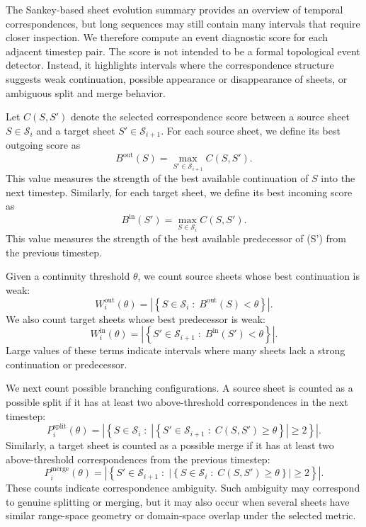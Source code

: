 \documentclass{vgtc}                          %
\newcommand{\Sheets}{\mathcal{S}}
\newcommand{\Sheet}{S}
\newcommand{\Score}{C}
\begin{document}
The Sankey-based sheet evolution summary provides an overview of temporal correspondences, but long sequences may still contain many intervals that require closer inspection. We therefore compute an event diagnostic score for each adjacent timestep pair. The score is not intended to be a formal topological event detector. Instead, it highlights intervals where the correspondence structure suggests weak continuation, possible appearance or disappearance of sheets, or ambiguous split and merge behavior.

Let $\Score(\Sheet,\Sheet')$ denote the selected correspondence score between a source sheet $\Sheet\in\Sheets_i$ and a target sheet $\Sheet'\in\Sheets_{i+1}$. For each source sheet, we define its best outgoing score as
\[
B^\mathrm{out}(\Sheet) =
\max_{\Sheet'\in\Sheets_{i+1}} \Score(\Sheet,\Sheet').
\]
This value measures the strength of the best available continuation of $\Sheet$ into the next timestep. Similarly, for each target sheet, we define its best incoming score as
\[
B^\mathrm{in}(\Sheet') =
\max_{\Sheet\in\Sheets_i} \Score(\Sheet,\Sheet').
\]
This value measures the strength of the best available predecessor of (\Sheet') from the previous timestep.

Given a continuity threshold $\theta$, we count source sheets whose best continuation is weak:
\[
W^\mathrm{out}_i(\theta) =
\left|
\left\{
\Sheet\in\Sheets_i
\;:\;
B^\mathrm{out}(\Sheet) < \theta
\right\}
\right|.
\]
We also count target sheets whose best predecessor is weak:
\[
W^\mathrm{in}_i(\theta) =
\left|
\left\{
\Sheet'\in\Sheets_{i+1}
\;:\;
B^\mathrm{in}(\Sheet') < \theta
\right\}
\right|.
\]
Large values of these terms indicate intervals where many sheets lack a strong continuation or predecessor.

We next count possible branching configurations. A source sheet is counted as a possible split if it has at least two above-threshold correspondences in the next timestep:
\[
P^\mathrm{split}_i(\theta) =
\left|
\left\{
\Sheet\in\Sheets_i
\;:\;
\left|
\left\{
\Sheet'\in\Sheets_{i+1}
\;:\;
\Score(\Sheet,\Sheet') \geq \theta
\right\}
\right|
\geq 2
\right\}
\right|.
\]
Similarly, a target sheet is counted as a possible merge if it has at least two above-threshold correspondences from the previous timestep:
\[
P^\mathrm{merge}_i(\theta) =
\left|
\left\{
\Sheet'\in\Sheets_{i+1}
\;:\;
\left|
\left\{
\Sheet\in\Sheets_i
\;:\;
\Score(\Sheet,\Sheet') \geq \theta
\right\}
\right|
\geq 2
\right\}
\right|.
\]
These counts indicate correspondence ambiguity. Such ambiguity may correspond to genuine splitting or merging, but it may also occur when several sheets have similar range-space geometry or domain-space overlap under the selected metric.
\end{document}
